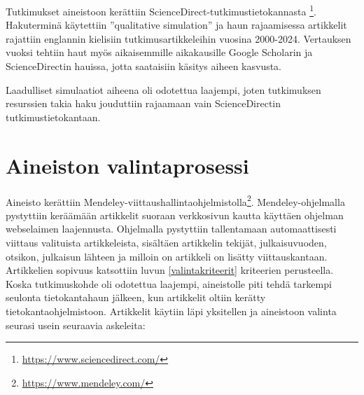 \documentclass[utf8]{gradu3}
\begin{document}
Tutkimukset aineistoon kerättiin ScienceDirect-tutkimustietokannasta \footnote{\url{https://www.sciencedirect.com/}}. 
Hakuterminä käytettiin ''qualitative simulation'' 
ja haun rajaamisessa artikkelit 
rajattiin englannin kielisiin tutkimusartikkeleihin vuosina 2000-2024. 
Vertauksen vuoksi tehtiin haut myös 
aikaisemmille aikakausille Google Scholarin ja ScienceDirectin hauissa,
jotta saataisiin käsitys aiheen kasvusta.

\begin{table}[h]
\centering
{}
\caption{Hakutulosten määrä hakukohteista}
\label{table: hakutulokset}
\end{table}

Laadulliset simulaatiot aiheena oli odotettua laajempi, 
joten tutkimuksen resurssien takia haku jouduttiin rajaamaan 
vain ScienceDirectin tutkimustietokantaan.

\section{Aineiston valintaprosessi} \label{valintaprosessi}
Aineisto kerättiin Mendeley-viittaushallintaohjelmistolla\footnote{\url{https://www.mendeley.com/}}. Mendeley-ohjelmalla pystyttiin keräämään artikkelit suoraan verkkosivun kautta käyttäen ohjelman webselaimen laajennusta. Ohjelmalla pystyttiin tallentamaan automaattisesti viittaus valituista artikkeleista, sisältäen artikkelin tekijät, julkaisuvuoden, otsikon, julkaisun lähteen ja milloin on artikkeli on lisätty viittauskantaan. Artikkelien sopivuus katsottiin luvun \ref{valintakriteerit} kriteerien perusteella. 
Koska tutkimuskohde oli odotettua laajempi, 
aineistolle piti tehdä tarkempi seulonta tietokantahaun jälkeen, 
kun artikkelit oltiin kerätty tietokantaohjelmistoon. 
Artikkelit käytiin läpi yksitellen ja aineistoon valinta seurasi usein seuraavia askeleita:
\end{document}
